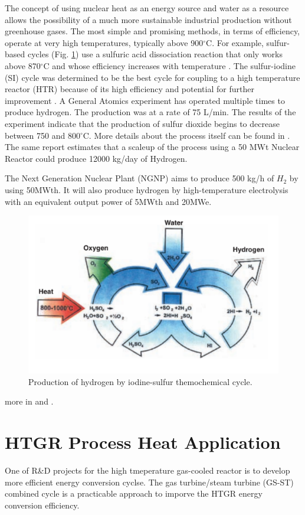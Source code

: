 The concept of using nuclear heat as an energy source and water as a resource allows the possibility of a much more sustainable industrial production without greenhouse gases. The most simple and promising methods, in terms of efficiency, operate at very high temperatures, typically above 900$^{\circ}$C. For example, sulfur-based cycles (Fig. \ref{fig:isulfur}) use a sulfuric acid dissociation reaction that only works above 870$^{\circ}$C and whose efficiency increases with temperature \cite{cea_gas-cooled_2006}. The sulfur-iodine (SI) cycle was determined to be the best cycle for coupling to a high temperature reactor (HTR) because of its high efficiency and potential for further improvement \cite{benjamin_russ_sulfur_2009}. A General Atomics experiment has operated multiple times to produce hydrogen. The production was at a rate of 75 L/min. The results of the experiment indicate that the production of sulfur dioxide begins to decrease between 750 and 800$^{\circ}$C. More details about the process itself can be found in \cite{benjamin_russ_sulfur_2009}. The same report estimates that a scaleup of the process using a 50 MWt Nuclear Reactor could produce 12000 kg/day of Hydrogen.

The Next Generation Nuclear Plant (NGNP) \cite{macdonald_ngnp_2003} aims to produce 500 kg/h of $H_2$ by using 50MWth. It will also produce hydrogen by high-temperature electrolysis with an equivalent output power of 5MWth and 20MWe.

\begin{figure}[H]
	\centering
	\includegraphics[width=0.4\linewidth]{figures/iodine-sulfur.png}
	\hfill
	\caption{Production of hydrogen by iodine-sulfur themochemical cycle.}
	\label{fig:isulfur}
\end{figure}

more in \cite{brown_high_2003} and \cite{terada_development_2007}.

\section{HTGR Process Heat Application}

One of R\&D projects for the high tmeperature gas-cooled reactor is to develop more efficient energy conversion cyclse. The gas turbine/steam turbine (GS-ST) combined cycle is a practicable approach to imporve the HTGR energy conversion efficiency.

